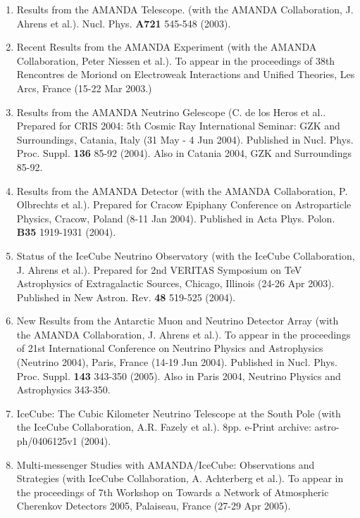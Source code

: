 \begin{enumerate}
\item Results from the AMANDA Telescope. (with the AMANDA
  Collaboration, J. Ahrens et al.).  Nucl. Phys. {\bf A721} 545-548
  (2003).

\item Recent Results from the AMANDA Experiment (with the AMANDA
  Collaboration, Peter Niessen et al.).  To appear in the proceedings
  of 38th Rencontres de Moriond on Electroweak Interactions and
  Unified Theories, Les Arcs, France (15-22 Mar 2003.)

\item Results from the AMANDA Neutrino Gelescope (C. de los Heros et
  al..  Prepared for CRIS 2004: 5th Cosmic Ray International Seminar:
  GZK and Surroundings, Catania, Italy (31 May - 4 Jun 2004).
  Published in Nucl. Phys. Proc. Suppl. {\bf 136} 85-92 (2004). Also
  in Catania 2004, GZK and Surroundings 85-92.

\item Results from the AMANDA Detector (with the AMANDA Collaboration,
  P. Olbrechts et al.).  Prepared for Cracow Epiphany Conference on
  Astroparticle Physics, Cracow, Poland (8-11 Jan 2004).  Published in
  Acta Phys. Polon. {\bf B35} 1919-1931 (2004).

\item Status of the IceCube Neutrino Observatory (with the IceCube
  Collaboration, J. Ahrens et al.).  Prepared for 2nd VERITAS
  Symposium on TeV Astrophysics of Extragalactic Sources, Chicago,
  Illinois (24-26 Apr 2003).  Published in New Astron. Rev. {\bf 48}
  519-525 (2004).

\item New Results from the Antarctic Muon and Neutrino Detector Array
  (with the AMANDA Collaboration, J. Ahrens et al.).  To appear in the
  proceedings of 21st International Conference on Neutrino Physics and
  Astrophysics (Neutrino 2004), Paris, France (14-19 Jun
  2004). Published in Nucl. Phys. Proc. Suppl. {\bf 143} 343-350
  (2005). Also in Paris 2004, Neutrino Physics and Astrophysics
  343-350.

\item IceCube: The Cubic Kilometer Neutrino Telescope at the South
  Pole (with the IceCube Collaboration, A.R. Fazely et al.).  8pp.
  e-Print archive: astro-ph/0406125v1 (2004).

\item Multi-messenger Studies with AMANDA/IceCube: Observations and
  Strategies (with IceCube Collaboration, A. Achterberg et al.).  To
  appear in the proceedings of 7th Workshop on Towards a Network of
  Atmospheric Cherenkov Detectors 2005, Palaiseau, France (27-29 Apr
  2005).


\end{enumerate}
